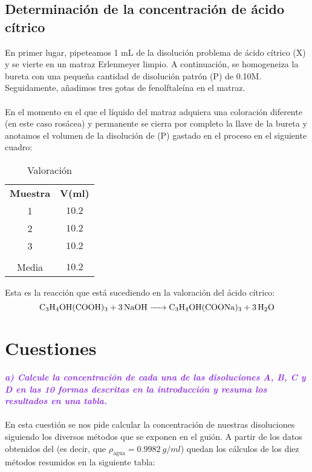 \clearpage
\subsection{Determinación de la concentración de ácido cítrico}
\noindent En primer lugar, pipeteamos 1 \si{mL} de la disolución problema de ácido cítrico (X) y se vierte en un matraz Erlenmeyer limpio. A continuación, se homogeneiza la bureta con una pequeña cantidad de disolución patrón (P) de  0.10M. Seguidamente, añadimos tres gotas de fenolftaleína en el matraz.\\\\ 
En el momento en el que el líquido del matraz adquiera una coloración diferente (en este caso rosácea) y permanente se cierra por completo la llave de la bureta y anotamos el volumen de la disolución de  (P) gastado en el proceso en el siguiente cuadro:\\

\begin{table}[H]
\centering
\begin{tabular}{cc}
\rowcolor[HTML]{9698ED} 
\textbf{Muestra} & \textbf{V(\si{ml})} \\
\rowcolor[HTML]{DAE8FC} 
1 & $10.2$ \\
2 & $10.2$ \\
\rowcolor[HTML]{DAE8FC} 
3 & $10.2$ \\
 &  \\
\rowcolor[HTML]{FCFF2F} 
Media & $10.2$
\end{tabular}
\caption{Valoración}
\label{valoracin}
\end{table}
\vspace{0.4cm}

\noindent Esta es la reacción que está sucediendo en la valoración del ácido cítrico:
\[\ce{C3H4OH(COOH)3 + 3NaOH -> C3H4OH(COONa)3 + 3H2O}\]
\clearpage

\section{Cuestiones}
\vspace{0.4cm}
\noindent\textcolor{BlueViolet}{\textbf{\textit{a) Calcule la concentración de cada una de las disoluciones A, B, C y D en las 10 formas descritas en la introducción y resuma los resultados en una tabla.}}}\\\\
\noindent En esta cuestión se nos pide calcular la concentración de nuestras disoluciones siguiendo los diversos métodos que se exponen en el guión. A partir de los datos obtenidos del  (es decir, que $\rho_{\text{agua}} = 0.9982\ \si{g/ml}$) quedan los cálculos de los diez métodos resumidos en la siguiente tabla:\\

